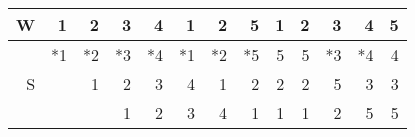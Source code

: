 \documentclass{standalone}
\begin{document}
\begin{tabular}{r|rrrrrrrrrrrr}
W & 1 & 2 & 3 & 4 & 1 & 2 & 5 & 1 & 2 & 3 & 4 & 5 \\
\hline
  & *1 & *2 & *3 & *4 & *1 & *2 & *5 & 5 & 5 & *3 & *4 & 4 \\
S &    &  1 &  2 &  3 &  4 &  1 &  2 & 2 & 2 &  5 &  3 & 3 \\
  &    &    &  1 &  2 &  3 &  4 &  1 & 1 & 1 &  2 &  5 & 5 \\
\end{tabular}
\end{document}
